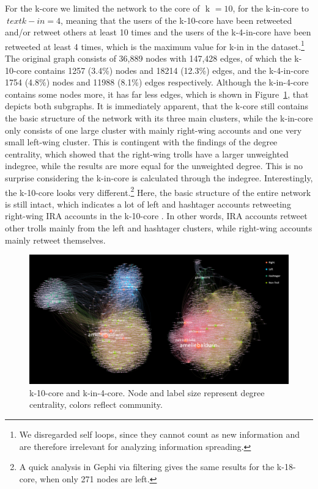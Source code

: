 \documentclass[12pt, titlepage=true, toc=bib]{scrartcl}
\begin{document}
For the k-core we limited the network to the core of \(\text{ k } = 10 \), for the k-in-core to \(\ text{ k-in } = 4\), meaning that the users of the k-10-core have been retweeted and/or retweet others at least 10 times and the users of the k-4-in-core have been retweeted at least 4 times, which is the maximum value for k-in in the dataset.\footnote{We disregarded self loops, since they cannot count as new information and are therefore irrelevant for analyzing information spreading.} The original graph consists of 36,889 nodes with 147,428 edges, of which the k-10-core contains 1257 (3.4\%) nodes and 18214 (12.3\%) edges, and the k-4-in-core 1754 (4.8\%) nodes and 11988 (8.1\%) edges respectively. Although the k-in-4-core contains some nodes more, it has far less edges, which is shown in Figure~\ref{fig:kcore}, that depicts both subgraphs. It is immediately apparent, that the k-core still contains the basic structure of the network with its three main clusters, while the k-in-core only consists of one large cluster with mainly right-wing accounts and one very small left-wing cluster. This is contingent with the findings of the degree centrality, which showed that the right-wing trolls have a larger unweighted indegree, while the results are more equal for the unweighted degree. This is no surprise considering the k-in-core is calculated through the indegree. Interestingly, the k-10-core looks very different.\footnote{A quick analysis in Gephi via filtering gives the same results for the k-18-core, when only 271 nodes are left.} Here, the basic structure of the entire network is still intact, which indicates a lot of left and hashtager accounts retweeting right-wing IRA accounts in the k-10-core . In other words, IRA accounts retweet other trolls mainly from the left and hashtager clusters, while right-wing accounts mainly retweet themselves.

\begin{figure}[!ht]
\centering
\includegraphics[width=0.95\linewidth]{k_graphs.png}
\caption{k-10-core and k-in-4-core. Node and label size represent degree centrality, colors reflect community.}
\label{fig:kcore}
\end{figure}
\end{document}
